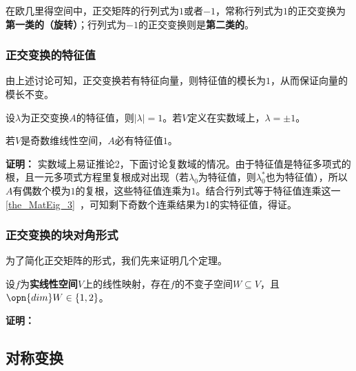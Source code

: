在欧几里得空间中，正交矩阵的行列式为$1$或者$-1$，常称行列式为$1$的正交变换为\textbf{第一类的（旋转）}；行列式为$-1$的正交变换则是\textbf{第二类的}。
\subsubsection{正交变换的特征值}
由上述讨论可知，正交变换若有特征向量，则特征值的模长为$1$，从而保证向量的模长不变。
\begin{corollary}{}
 设$\lambda$为正交变换$A$的特征值，则$|\lambda|=1$。若$V$定义在实数域上，$\lambda=\pm 1$。
\end{corollary}
\begin{corollary}{}
若$V$是奇数维线性空间，$A$必有特征值$1$。
\end{corollary}
\textbf{证明：}
实数域上易证推论2，下面讨论复数域的情况。由于特征值是特征多项式的根，且一元多项式方程里复根成对出现（若$\lambda_0$为特征值，则$\lambda_0^{*}$也为特征值），所以$A$有偶数个模为$1$的复根，这些特征值连乘为$1$。结合行列式等于特征值连乘这一\autoref{the_MatEig_3}~，可知剩下奇数个连乘结果为1的实特征值，得证。
\subsubsection{正交变换的块对角形式}
为了简化正交矩阵的形式，我们先来证明几个定理。
\begin{theorem}{}
设$f$为\textbf{实线性空间}$V$上的线性映射，存在$f$的不变子空间$W\subseteq V$，且$\opn{dim}W\in\{1,2\}$。
\end{theorem}
\textbf{证明：}

\subsection{对称变换}


